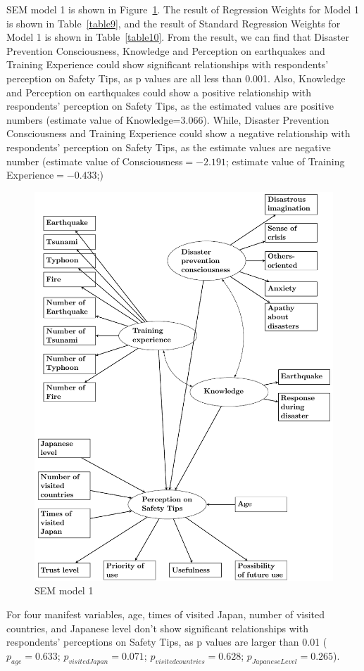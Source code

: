SEM model 1 is shown in Figure~\ref{fig23}. The result of Regression Weights for Model 1 is shown in Table~\ref{table9}, and the result of Standard Regression Weights for Model 1 is shown in Table~\ref{table10}. From the result, we can find that Disaster Prevention Consciousness, Knowledge and Perception on earthquakes and Training Experience could show significant relationships with respondents' perception on Safety Tips, as p values are all less than 0.001. Also, Knowledge and Perception on earthquakes could show a positive relationship with respondents' perception on Safety Tips, as the estimated values are positive numbers (estimate value of Knowledge=3.066). While, Disaster Prevention Consciousness and Training Experience could show a negative relationship with respondents' perception on Safety Tips, as the estimate values are negative number (estimate value of Consciousness$=-2.191$; estimate value of Training Experience$=-0.433$;) 

\begin{figure}[h]
  \includegraphics[width=0.5\linewidth]{Figure/Figure23.png}
  \centering
  \caption{SEM model 1}
  \label{fig23}
\end{figure}

For four manifest variables, age, times of visited Japan, number of visited countries, and Japanese level don't show significant relationships with respondents' perceptions on Safety Tips, as p values are larger than 0.01 ($p_{age} =0.633$; $p_{visitedJapan} =0.071$; $p_{visitedcountries} =0.628$; $p_{JapaneseLevel} =0.265$). 

